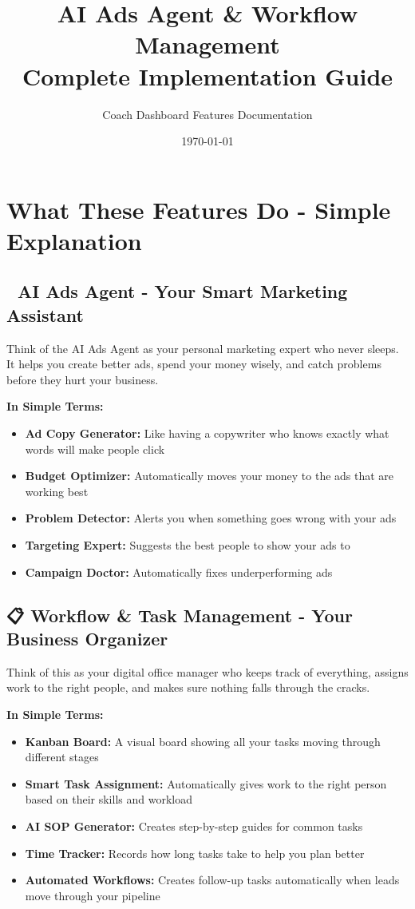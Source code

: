 \documentclass[12pt,a4paper]{article}
\title{\Huge\textbf{AI Ads Agent \& Workflow Management\\Complete Implementation Guide}}
\author{Coach Dashboard Features Documentation}
\date{\today}
\begin{document}
\maketitle

\section{What These Features Do - Simple Explanation}

\subsection{🤖 AI Ads Agent - Your Smart Marketing Assistant}
Think of the AI Ads Agent as your personal marketing expert who never sleeps. It helps you create better ads, spend your money wisely, and catch problems before they hurt your business.

\textbf{In Simple Terms:}
\begin{itemize}
    \item \textbf{Ad Copy Generator:} Like having a copywriter who knows exactly what words will make people click
    \item \textbf{Budget Optimizer:} Automatically moves your money to the ads that are working best
    \item \textbf{Problem Detector:} Alerts you when something goes wrong with your ads
    \item \textbf{Targeting Expert:} Suggests the best people to show your ads to
    \item \textbf{Campaign Doctor:} Automatically fixes underperforming ads
\end{itemize}

\subsection{📋 Workflow \& Task Management - Your Business Organizer}
Think of this as your digital office manager who keeps track of everything, assigns work to the right people, and makes sure nothing falls through the cracks.

\textbf{In Simple Terms:}
\begin{itemize}
    \item \textbf{Kanban Board:} A visual board showing all your tasks moving through different stages
    \item \textbf{Smart Task Assignment:} Automatically gives work to the right person based on their skills and workload
    \item \textbf{AI SOP Generator:} Creates step-by-step guides for common tasks
    \item \textbf{Time Tracker:} Records how long tasks take to help you plan better
    \item \textbf{Automated Workflows:} Creates follow-up tasks automatically when leads move through your pipeline
\end{itemize}
\end{document}
